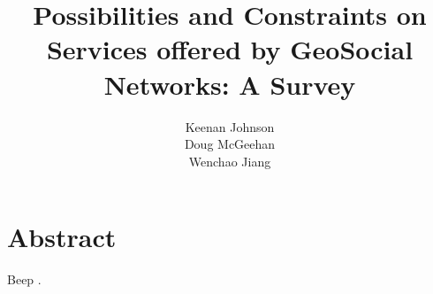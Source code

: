\documentclass[11pt]{article}
\title{Possibilities and Constraints on Services offered by GeoSocial Networks: A Survey}
\author{Keenan Johnson\\
		Doug McGeehan\\
		Wenchao Jiang}
\begin{document}
\maketitle

\section{Abstract}

Beep \cite{carbunar_you_2012}\cite{carbunar_:_2014}\cite{carbunar_shy_2012}\cite{yoon_social_2012}\cite{carbunar_private_2014}\cite{mascetti_privacy_2011}\cite{puttaswamy_preserving_2014}\cite{cheng_personalized_2011}\cite{bao_partner-marketing_2014}\cite{li_nearby_2013}\cite{zheng_mining_2012}\cite{ruiz_vicente_location-related_2011}\cite{bao_location-based_2012}\cite{levandoski_lars:_2012}\cite{karamshuk_geo-spotting:_2013}\cite{wang_face--face_2012}\cite{cho_friendship_2011}\cite{scellato_exploiting_2011}\cite{ye_exploiting_2011}\cite{chen_discovering_2011}\cite{wei_constructing_2012}\cite{lin_moving-object_2011}.

{}

\end{document}
